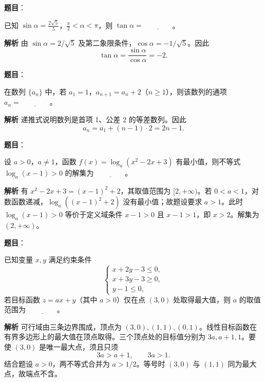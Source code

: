 \begin{answer}

\textbf{题目}：

已知 \(\sin\alpha=\frac{2\sqrt5}{5}\)，\(\frac\pi2<\alpha<\pi\)，则 \(\tan\alpha=\underline{\qquad\qquad}\)。

\textbf{解析}
由 \(\sin\alpha=2/\sqrt5\) 及第二象限条件，\(\cos\alpha=-1/\sqrt5\)。因此
\nopagebreak[4]
\[
\tan\alpha=\frac{\sin\alpha}{\cos\alpha}=-2.
\]


\end{answer}
\begin{answer}

\textbf{题目}：

在数列 \(\{a_n\}\) 中，若 \(a_1=1\)，\(a_{n+1}=a_n+2\)（\(n\geqslant1\)），则该数列的通项 \(a_n=\underline{\qquad\qquad}\)。

\textbf{解析}
递推式说明数列是首项 1、公差 2 的等差数列。因此
\nopagebreak[4]
\[
a_n=a_1+(n-1)\cdot2=2n-1.
\]


\end{answer}
\begin{answer}

\textbf{题目}：

设 \(a>0\)，\(a\ne1\)，函数 \(f(x)=\log_a(x^2-2x+3)\) 有最小值，则不等式 \(\log_a(x-1)>0\) 的解集为 \(\underline{\qquad\qquad}\)。

\textbf{解析}
有 \(x^2-2x+3=(x-1)^2+2\)，其取值范围为 \([2,+\infty)\)。若 \(0<a<1\)，对数函数递减，\(\log_a((x-1)^2+2)\) 没有最小值；故题设要求 \(a>1\)。此时 \(\log_a(x-1)>0\) 等价于定义域条件 \(x-1>0\) 且 \(x-1>1\)，即 \(x>2\)。解集为 \((2,+\infty)\)。


\end{answer}
\begin{answer}

\textbf{题目}：

已知变量 \(x,y\) 满足约束条件
\nopagebreak[4]
\[
\begin{cases}
x+2y-3\leqslant0,\\
x+3y-3\geqslant0,\\
y-1\leqslant0,
\end{cases}
\]
若目标函数 \(z=ax+y\)（其中 \(a>0\)）仅在点 \((3,0)\) 处取得最大值，则 \(a\) 的取值范围为 \(\underline{\qquad\qquad}\)。

\textbf{解析}
可行域由三条边界围成，顶点为 \((3,0),(1,1),(0,1)\)。线性目标函数在有界多边形上的最大值在顶点取得。三个顶点处的目标值分别为 \(3a,a+1,1\)。要使 \((3,0)\) 是唯一最大点，须且只须
\nopagebreak[4]
\[
3a>a+1,\qquad 3a>1.
\]
结合题设 \(a>0\)，两不等式合并为 \(a>1/2\)。等号时 \((3,0)\) 与 \((1,1)\) 同为最大点，故端点不含。


\end{answer}
